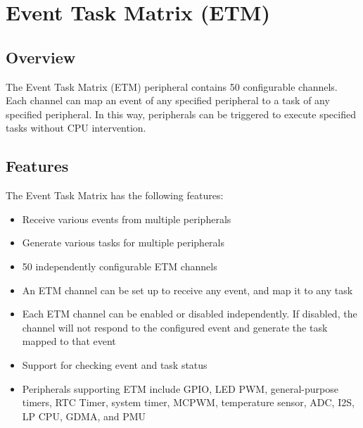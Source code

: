 \documentclass[main\_\_EN.tex]{subfiles}
\begin{document}

\ifglobal
\else
    \listoftodos
    {\let\clearpage\relax \listofdonetodos}
    \tableofcontents
\fi


\newcommand{\regfieldrotate}[1]{\regfield{\rotatebox{20}{#1}}}


\hypertarget{evntaskmatrix}{}
\chapter{Event Task Matrix (ETM)}
\label{mod:evntaskmatrix}



\section{Overview}
The Event Task Matrix (ETM) peripheral contains 50 configurable channels. Each channel can map an event of any specified peripheral to a task of any specified peripheral. In this way, peripherals can be triggered to execute specified tasks without CPU intervention.



\section{Features}
\label{sec:evntaskmatrix-features}

The Event Task Matrix has the following features:
\begin{itemize}
    \item Receive various events from multiple peripherals
    \item Generate various tasks for multiple peripherals
    \item 50 independently configurable ETM channels
    \item An ETM channel can be set up to receive any event, and map it to any task
    \item Each ETM channel can be enabled or disabled independently. If disabled, the channel will not respond to the configured event and generate the task mapped to that event
    \item Support for checking event and task status
    \item Peripherals supporting ETM include GPIO, LED PWM, general-purpose timers, RTC Timer, system timer, MCPWM, temperature sensor, ADC, I2S, LP CPU, GDMA, and PMU
\end{itemize}
\end{document}
